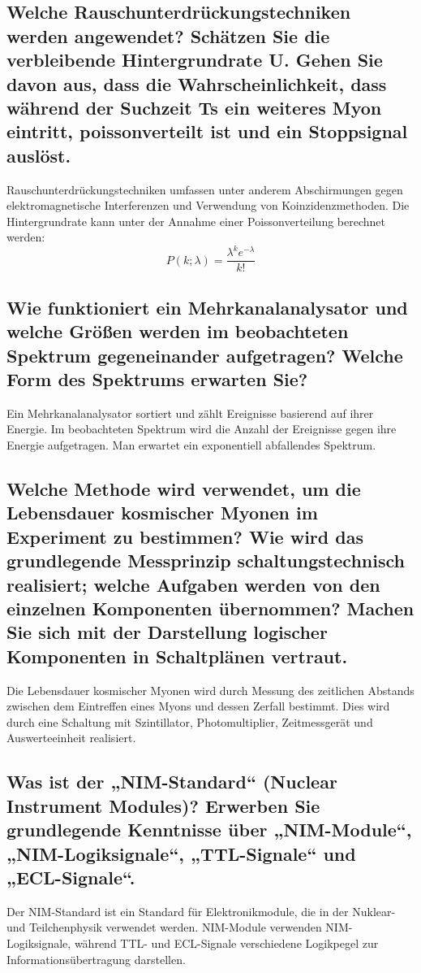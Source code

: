 \documentclass[a4paper,12pt]{article}
\begin{document}
{\subsection{Welche Rauschunterdrückungstechniken werden angewendet? Schätzen Sie die verbleibende Hintergrundrate U. Gehen Sie davon aus, dass die Wahrscheinlichkeit, dass während der Suchzeit Ts ein weiteres Myon eintritt, poissonverteilt ist und ein Stoppsignal auslöst.}
Rauschunterdrückungstechniken umfassen unter anderem Abschirmungen gegen elektromagnetische Interferenzen und Verwendung von Koinzidenzmethoden. Die Hintergrundrate kann unter der Annahme einer Poissonverteilung berechnet werden:
$$P(k; \lambda) = \frac{\lambda^k e^{-\lambda}}{k!}$$

\subsection{Wie funktioniert ein Mehrkanalanalysator und welche Größen werden im beobachteten Spektrum gegeneinander aufgetragen? Welche Form des Spektrums erwarten Sie?}
Ein Mehrkanalanalysator sortiert und zählt Ereignisse basierend auf ihrer Energie. Im beobachteten Spektrum wird die Anzahl der Ereignisse gegen ihre Energie aufgetragen. Man erwartet ein exponentiell abfallendes Spektrum.

\subsection{Welche Methode wird verwendet, um die Lebensdauer kosmischer Myonen im Experiment zu bestimmen? Wie wird das grundlegende Messprinzip schaltungstechnisch realisiert; welche Aufgaben werden von den einzelnen Komponenten übernommen? Machen Sie sich mit der Darstellung logischer Komponenten in Schaltplänen vertraut.}
Die Lebensdauer kosmischer Myonen wird durch Messung des zeitlichen Abstands zwischen dem Eintreffen eines Myons und dessen Zerfall bestimmt. Dies wird durch eine Schaltung mit Szintillator, Photomultiplier, Zeitmessgerät und Auswerteeinheit realisiert.

\subsection{Was ist der „NIM-Standard“ (Nuclear Instrument Modules)? Erwerben Sie grundlegende Kenntnisse über „NIM-Module“, „NIM-Logiksignale“, „TTL-Signale“ und „ECL-Signale“.}
Der NIM-Standard ist ein Standard für Elektronikmodule, die in der Nuklear- und Teilchenphysik verwendet werden. NIM-Module verwenden NIM-Logiksignale, während TTL- und ECL-Signale verschiedene Logikpegel zur Informationsübertragung darstellen.
}
\end{document}
